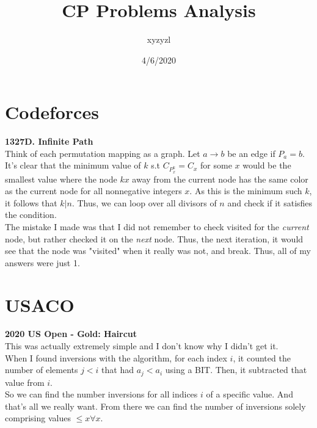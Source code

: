 \documentclass{article}
\title{CP Problems Analysis}
\author{xyzyzl}
\date{4/6/2020}
\begin{document}
\maketitle

\section{Codeforces}
\textbf{1327D. Infinite Path}\\
Think of each permutation mapping as a graph. Let $a \rightarrow b$ be an edge if $P_a=b$. It's clear that the minimum value of $k$ s.t $C_{P^k_x} = C_x$ for some $x$ would be the smallest value where the node $kx$ away from the current node has the same color as the current node for all nonnegative integers $x$. As this is the minimum such $k$, it follows that $k | n$. Thus, we can loop over all divisors of $n$ and check if it satisfies the condition. \\
The mistake I made was that I did not remember to check visited for the \textit{current} node, but rather checked it on the \textit{next} node. Thus, the next iteration, it would see that the node was "visited" when it really was not, and break. Thus, all of my answers were just 1.

\section{USACO}
\textbf{2020 US Open - Gold: Haircut}\\
This was actually extremely simple and I don't know why I didn't get it.\\
When I found inversions with the algorithm, for each index $i$, it counted the number of elements $j < i$ that had $a_j < a_i$ using a BIT. Then, it subtracted that value from $i$. \\
So we can find the number inversions for all indices $i$ of a specific value. And that's all we really want. From there we can find the number of inversions solely comprising values $\le x \forall x$.
\end{document}
